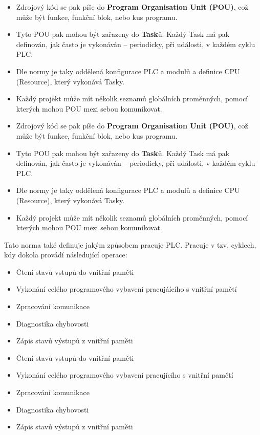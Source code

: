 \begin{itemize}
  \item Zdrojový kód se pak píše do \textbf{Program Organisation Unit (POU)}, což může být funkce, funkční blok, nebo kus programu.
  \item Tyto POU pak mohou být zařazeny do \textbf{Task}ů. Každý Task má pak definován, jak často je vykonáván – periodicky, při události, v každém cyklu PLC. 
  \item Dle normy je taky oddělená konfigurace PLC a modulů a definice CPU (Resource), který vykonává Tasky.
  \item Každý projekt může mít několik seznamů globálních proměnných, pomocí kterých mohou POU mezi sebou komunikovat.  
    \item Zdrojový kód se pak píše do \textbf{Program Organisation Unit (POU)}, což může být funkce, funkční blok, nebo kus programu.
    \item Tyto POU pak mohou být zařazeny do \textbf{Task}ů. Každý Task má pak definován, jak často je vykonáván – periodicky, při události, v každém cyklu PLC.
    \item Dle normy je taky oddělená konfigurace PLC a modulů a definice CPU (Resource), který vykonává Tasky.
    \item Každý projekt může mít několik seznamů globálních proměnných, pomocí kterých mohou POU mezi sebou komunikovat.
\end{itemize}

Tato norma také definuje jakým způsobem pracuje PLC. Pracuje v tzv. cyklech, kdy dokola provádí následující operace:
\begin{itemize}
  \item Čtení stavů vstupů do vnitřní paměti
  \item Vykonání celého programového vybavení pracujáícího s vnitřní pamětí
  \item Zpracování komunikace
  \item Diagnostika chybovosti
  \item Zápis stavů výstupů z vnitřní paměti
    \item Čtení stavů vstupů do vnitřní paměti
    \item Vykonání celého programového vybavení pracujícího s vnitřní pamětí
    \item Zpracování komunikace
    \item Diagnostika chybovosti
    \item Zápis stavů výstupů z vnitřní paměti
\end{itemize}

